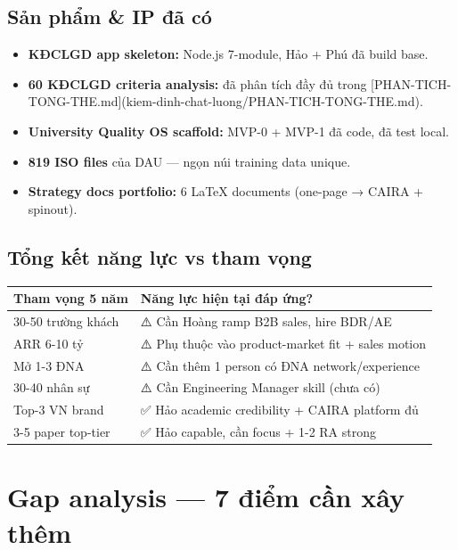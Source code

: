 \documentclass[11pt,a4paper]{article}
\begin{document}
\subsection{Sản phẩm \& IP đã có}

\begin{itemize}
\item \textbf{KĐCLGD app skeleton:} Node.js 7-module, Hảo + Phú đã build base.
\item \textbf{60 KĐCLGD criteria analysis:} đã phân tích đầy đủ trong [PHAN-TICH-TONG-THE.md](kiem-dinh-chat-luong/PHAN-TICH-TONG-THE.md).
\item \textbf{University Quality OS scaffold:} MVP-0 + MVP-1 đã code, đã test local.
\item \textbf{819 ISO files} của DAU --- ngọn núi training data unique.
\item \textbf{Strategy docs portfolio:} 6 LaTeX documents (one-page → CAIRA + spinout).
\end{itemize}

\subsection{Tổng kết năng lực vs tham vọng}

\begin{tabularx}{\linewidth}{@{}p{4cm} X@{}}
\toprule
\textbf{Tham vọng 5 năm} & \textbf{Năng lực hiện tại đáp ứng?} \\
\midrule
30-50 trường khách & ⚠️ Cần Hoàng ramp B2B sales, hire BDR/AE \\
ARR 6-10 tỷ & ⚠️ Phụ thuộc vào product-market fit + sales motion \\
Mở 1-3 ĐNA & ⚠️ Cần thêm 1 person có ĐNA network/experience \\
30-40 nhân sự & ⚠️ Cần Engineering Manager skill (chưa có) \\
Top-3 VN brand & ✅ Hảo academic credibility + CAIRA platform đủ \\
3-5 paper top-tier & ✅ Hảo capable, cần focus + 1-2 RA strong \\
\bottomrule
\end{tabularx}

\clearpage

\section{Gap analysis --- 7 điểm cần xây thêm}
\end{document}
